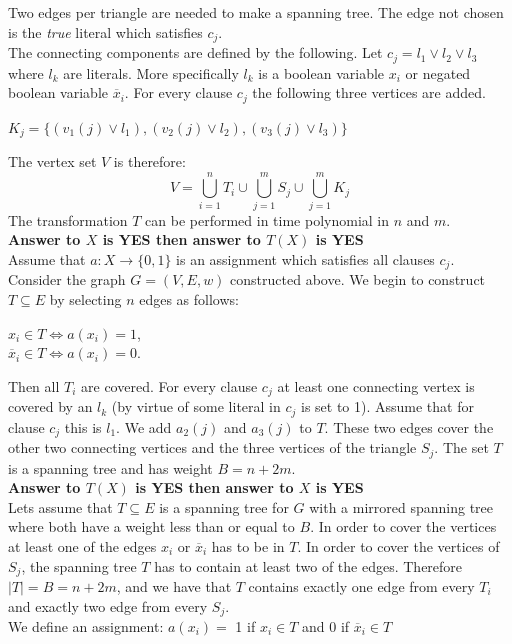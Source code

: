 \documentclass[12pt]{report}
\begin{document}
Two edges per triangle are needed to make a spanning tree. The edge not chosen is the \emph{true} literal which satisfies $c_j$.\\
The connecting components are defined by the following. Let $c_j = l_1 \vee l_2 \vee l_3$ where $l_k$ are literals. More specifically $l_k$ is a boolean variable $x_i$ or negated boolean variable $\overline{x}_i$. For every clause $c_j$ the following three vertices are added.
\begin{center}
$K_j = \{(v_1(j) \vee l_1), (v_2(j) \vee l_2), (v_3(j) \vee l_3)\}$
\end{center}
The vertex set $V$ is therefore:
$$V = \bigcup_{i=1}^{n}{T_i} \cup \bigcup_{j=1}^{m}{S_j} \cup \bigcup_{j=1}^{m}{K_j}$$
The transformation $T$ can be performed in time polynomial in $n$ and $m$.
\\[0.25cm] \textbf{Answer to $X$ is YES then answer to $T(X)$ is YES}\\
Assume that $a: X \rightarrow \{0,1\}$ is an assignment which satisfies all clauses $c_j$. Consider the graph $G = (V,E,w)$ constructed above. We begin to construct $T \subseteq E$ by selecting $n$ edges as follows:
\begin{center}
$x_i \in T \Longleftrightarrow a(x_i) = 1$,\\
$\overline{x}_i \in T \Longleftrightarrow a(x_i) = 0$.
\end{center}
Then all $T_i$ are covered. For every clause $c_j$ at least one connecting vertex is covered by an $l_k$ (by virtue of some literal in $c_j$ is set to 1). Assume that for clause $c_j$ this is $l_1$. We add $a_2(j)$ and $a_3(j)$ to $T$. These two edges cover the other two connecting vertices and the three vertices of the triangle $S_j$. The set $T$ is a spanning tree and has weight $B = n + 2m$.
\\[0.25cm] \textbf{Answer to $T(X)$ is YES then answer to $X$ is YES}\\
Lets assume that $T \subseteq E$ is a spanning tree for $G$ with a mirrored spanning tree where both have a weight less than or equal to $B$. In order to cover the vertices at least one of the edges $x_i$ or $\overline{x}_i$ has to be in $T$. In order to cover the vertices of $S_j$, the spanning tree $T$ has to contain at least two of the edges. Therefore $|T| = B = n + 2m$, and we have that $T$ contains exactly one edge from every $T_i$ and exactly two edge from every $S_j$.\\
We define an assignment: $a(x_i) =$ 1 if $x_i \in T$ and 0 if $\overline{x}_i \in T$\\
\end{document}
